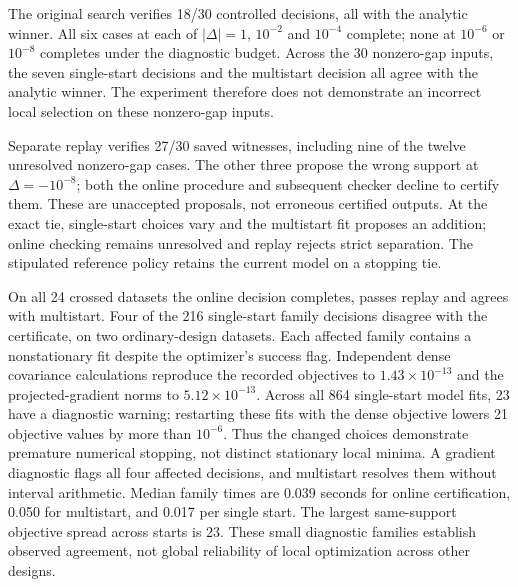 The original search verifies 18/30 controlled decisions,
all with the analytic winner. All six cases at each of $|\Delta|=1$, $10^{-2}$
and $10^{-4}$ complete; none at $10^{-6}$ or $10^{-8}$ completes under
the diagnostic budget. Across the 30 nonzero-gap inputs, the seven single-start
decisions and the multistart decision all agree with the analytic winner.
The experiment therefore does not demonstrate an incorrect local selection
on these nonzero-gap inputs.

Separate replay verifies 27/30 saved witnesses, including nine of the
twelve unresolved nonzero-gap cases. The other three propose the wrong support
at $\Delta=-10^{-8}$; both the online procedure and subsequent checker decline
to certify them. These are unaccepted proposals, not erroneous certified outputs.
At the exact tie, single-start choices vary and the multistart fit proposes an
addition; online checking remains unresolved and replay rejects strict separation.
The stipulated reference policy retains the current model on a stopping tie.

On all 24 crossed datasets the online decision completes, passes replay and
agrees with multistart. Four of the 216 single-start family decisions disagree
with the certificate, on two ordinary-design datasets. Each affected family
contains a nonstationary fit despite the optimizer's success flag. Independent
dense covariance calculations reproduce the recorded objectives to
$1.43\times10^{-13}$ and the projected-gradient norms to $5.12\times10^{-13}$.
Across all 864 single-start model fits, 23 have a diagnostic warning; restarting
these fits with the dense objective lowers 21 objective values by more than
$10^{-6}$. Thus the changed choices demonstrate premature numerical stopping,
not distinct stationary local minima. A gradient diagnostic flags all four
affected decisions, and multistart resolves them without interval arithmetic.
Median family times are 0.039 seconds for online certification,
0.050 for multistart, and
0.017 per single start.
The largest same-support objective spread across starts is
$23$.
These small diagnostic families establish observed agreement, not global
reliability of local optimization across other designs.
